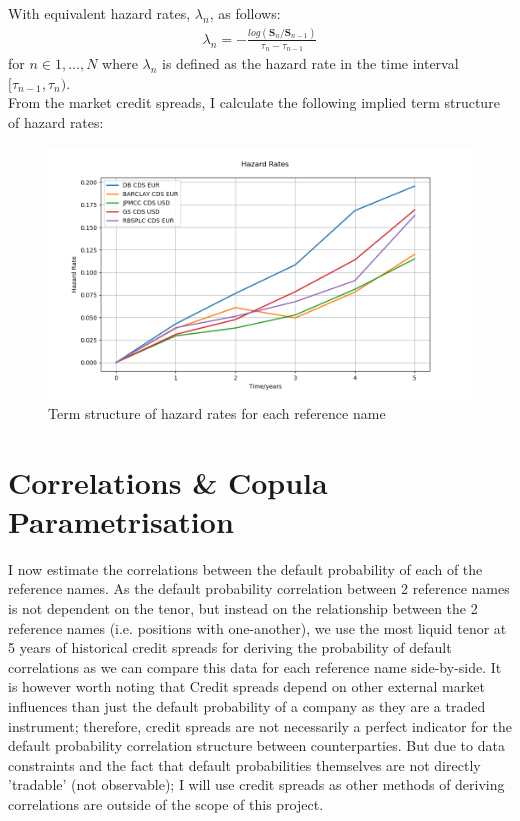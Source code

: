 \documentclass{report}
\theoremstyle{plain}
\theoremstyle{definition}
\begin{document}
With equivalent hazard rates, $\lambda_n$, as follows:
\begin{align*}
\lambda_n = -\frac{log(\mathbf{S}_n/\mathbf{S}_{n-1})}{\tau_{n} - \tau_{n-1}}
\end{align*}
for $n \in {1,...,N}$ where $\lambda_n$ is defined as the hazard rate in the time interval $[\tau_{n-1},\tau_n)$.\\

From the market credit spreads, I calculate the following implied term structure of hazard rates:

\begin{figure}[H]
	\begin{center}
		\includegraphics[width=15cm]{Hazard_Rates.png}
		\caption{Term structure of hazard rates for each reference name} 
		\label{Hazard_Rates}
	\end{center}
\end{figure}


\chapter{Correlations \& Copula Parametrisation}

I now estimate the correlations between the default probability of each of the reference names. As the default probability correlation between 2 reference names is not dependent on the tenor, but instead on the relationship between the 2 reference names (i.e. positions with one-another), we use the most liquid tenor at 5 years of historical credit spreads for deriving the probability of default correlations as we can compare this data for each reference name side-by-side. It is however worth noting that Credit spreads depend on other external market influences than just the default probability of a company as they are a traded instrument; therefore, credit spreads are not necessarily a perfect indicator for the default probability correlation structure between counterparties. But due to data constraints and the fact that default probabilities themselves are not directly 'tradable' (not observable); I will use credit spreads as other methods of deriving correlations are outside of the scope of this project.\\
\end{document}
